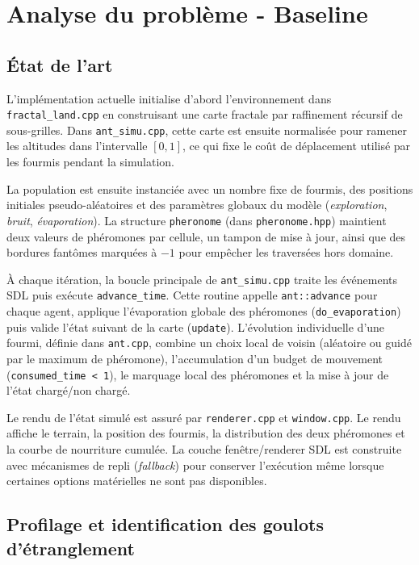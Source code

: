 \section{Analyse du problème - Baseline}

\subsection{État de l'art}


L'implémentation actuelle initialise d'abord l'environnement dans \texttt{fractal\_land.cpp} en construisant
 une carte fractale par raffinement récursif de sous-grilles. Dans \texttt{ant\_simu.cpp}, cette carte est 
 ensuite normalisée pour ramener les altitudes dans l'intervalle $[0,1]$, ce qui fixe le coût de déplacement
  utilisé par les fourmis pendant la simulation.


La population est ensuite instanciée avec un nombre fixe de fourmis, des positions initiales pseudo-aléatoires
 et des paramètres globaux du modèle (\textit{exploration}, \textit{bruit}, \textit{évaporation}). La structure
  \texttt{pheronome} (dans \texttt{pheronome.hpp}) maintient deux valeurs de phéromones par cellule, un tampon
   de mise à jour, ainsi que des bordures fantômes marquées à \(-1\) pour empêcher les traversées hors domaine.


À chaque itération, la boucle principale de \texttt{ant\_simu.cpp} traite les événements SDL puis exécute 
\texttt{advance\_time}. Cette routine appelle \texttt{ant::advance} pour chaque agent, applique 
l'évaporation globale des phéromones (\texttt{do\_evaporation}) puis valide l'état suivant de la carte
 (\texttt{update}). L'évolution individuelle d'une fourmi, définie dans \texttt{ant.cpp}, combine un 
 choix local de voisin (aléatoire ou guidé par le maximum de phéromone), l'accumulation d'un budget de 
 mouvement (\texttt{consumed\_time < 1}), le marquage local des phéromones et la mise à jour de l'état 
 chargé/non chargé.


Le rendu de l'état simulé est assuré par \texttt{renderer.cpp} et \texttt{window.cpp}. Le rendu affiche 
le terrain, la position des fourmis, la distribution des deux phéromones et la courbe de nourriture cumulée. 
La couche fenêtre/renderer SDL est construite avec mécanismes de repli (\textit{fallback}) pour conserver 
l'exécution même lorsque certaines options matérielles ne sont pas disponibles.



\subsection{Profilage et identification des goulots d'étranglement}

